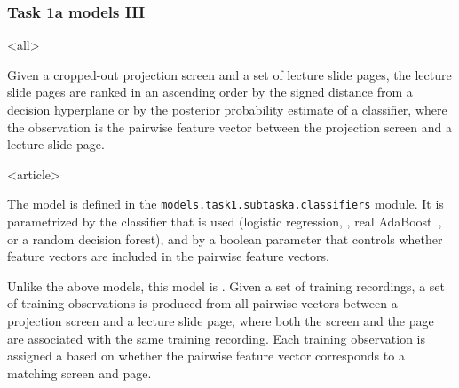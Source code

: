 \begin{frame}
\frametitle<presentation>{Task 1a models III}
\begin{description}

\mode
<all>

  \item[First-tier classifiers]
    Given a cropped-out projection screen and a set of lecture slide
    pages, the lecture slide pages are ranked in an ascending order by the
    signed distance from a decision hyperplane or by the posterior probability
    estimate of a classifier, where the observation is the pairwise feature
    vector between the projection screen and a lecture slide page.

\mode
<article>

    The model is defined in the \texttt{models.task1.subtaska.classifiers}
    module. It is parametrized by the classifier that is used (logistic
    regression, , real AdaBoost~\cite{friedman2000additive}, or a
    random decision forest), and by a boolean parameter that controls whether
     feature vectors are included in the pairwise feature vectors.

    Unlike the above models, this model is . Given a set of
    training recordings, a set of training observations is produced from all
    pairwise vectors between a projection screen and a lecture slide page,
    where both the screen and the page are associated with the same training
    recording. Each training observation is assigned a  based on
    whether the pairwise feature vector corresponds to a matching screen and
    page.
    

\end{description}
\end{frame}

